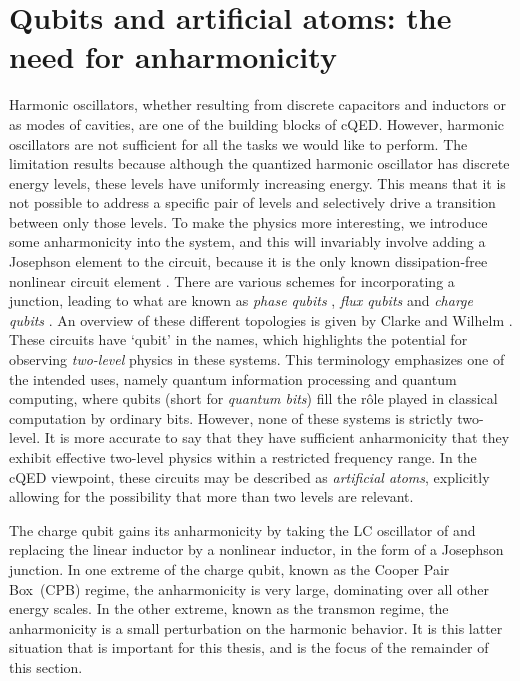 \section{Qubits and artificial atoms: the need for anharmonicity\label{sec:qandaa}}
Harmonic oscillators, whether resulting from discrete capacitors and inductors or as modes of cavities, are one of the building blocks of cQED\@. However, harmonic oscillators are not sufficient for all the tasks we would like to perform. The limitation results because although the quantized harmonic oscillator has discrete energy levels, these levels have uniformly increasing energy. This means that it is not possible to address a specific pair of levels and selectively drive a transition between only those levels. To make the physics more interesting, we introduce some anharmonicity into the system, and  this will invariably involve adding a Josephson element to the circuit, because it is the only known dissipation-free nonlinear circuit element \cite{devoret_martinis_review}. There are various schemes for incorporating a junction, leading to what are known as \emph{phase qubits} \cite{martinis_rabi_2002}, \emph{flux qubits} \cite{friedman_quantum_2000,vanDerWal_superposition_2000} and \emph{charge qubits} \cite{bouchiat_quantum_1998,nakamura_coherent_1999}. An overview of these different topologies is given by Clarke and Wilhelm \cite{clarke_superconducting_2008}. These circuits have `qubit' in the names, which highlights the potential for observing \emph{two-level} physics in these systems. This terminology emphasizes one of the intended uses, namely quantum information processing and quantum computing, where qubits (short for \emph{quantum bits}) fill the r\^ole played in classical computation by ordinary bits. However, none of these systems is strictly two-level. It is more accurate to say that they have sufficient anharmonicity that they exhibit effective two-level physics within a restricted frequency range. In the cQED viewpoint, these circuits may be described as \emph{artificial atoms}, explicitly allowing for the possibility that more than two levels are relevant.

The charge qubit gains its anharmonicity by taking the LC oscillator of  and replacing the linear inductor by a nonlinear inductor, in the form of a Josephson junction. In one extreme of the charge qubit, known as the Cooper Pair Box~(CPB) regime, the anharmonicity is very large, dominating over all other energy scales. In the other extreme, known as the transmon regime, the anharmonicity is a small perturbation on the harmonic behavior. It is this latter situation that is important for this thesis, and is the focus of the remainder of this section.

